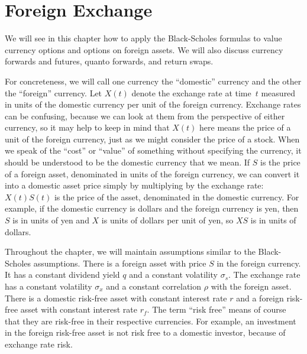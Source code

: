 \chapter{Foreign Exchange}\label{c_foreignexchange}

We will see in this chapter how to apply the Black-Scholes formulas to value currency options and options on foreign assets.  We will also discuss currency forwards and futures, quanto forwards, and return swaps.  

For concreteness, we will call one currency the ``domestic'' currency and the other the ``foreign'' currency. 
Let $X(t)$ denote the exchange rate at time~$t$ measured in units of the domestic currency per unit of the foreign currency.  Exchange rates can be confusing, because we can look at them from the perspective of either currency, so it may help to keep in mind that $X(t)$ here means the price of a unit of the foreign currency, just as we might consider the price of a stock.   When we speak of the ``cost'' or ``value'' of something without specifying the currency, it should be understood to be the domestic currency that we mean.  If $S$ is the price of a foreign asset, denominated in units of the foreign currency, we can convert it into a domestic asset price simply by multiplying by the exchange rate:  $X(t)S(t)$ is the price of the asset, denominated in the domestic currency.  For example, if the domestic currency is dollars and the foreign currency is yen, then $S$ is in units of yen and $X$ is units of dollars per unit of yen, so $XS$ is in units of dollars.

Throughout the chapter, we will maintain assumptions similar to the Black-Scholes assumptions.  There is a foreign asset with price $S$ in the foreign currency.  It has a constant dividend yield $q$ and a constant volatility $\sigma_s$.  The exchange rate has a constant volatility $\sigma_x$ and a constant correlation $\rho$ with the foreign asset.  There is a domestic risk-free asset with constant interest rate $r$ and a foreign risk-free asset with constant interest rate $r_f$.  The term ``risk free'' means of course that they are risk-free in their respective currencies.  For example, an investment in the foreign risk-free asset is not risk free to a domestic investor, because of exchange rate risk.


